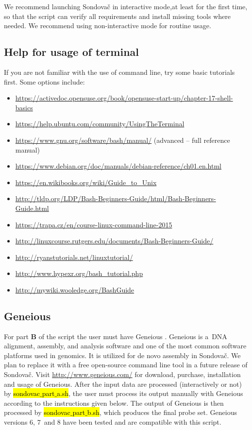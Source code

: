 \documentclass[a4paper, 11pt, twoside]{article}
\renewcommand{\texttt}[1]{\hl{\ttfamily #1}}
\begin{document}
We recommend launching Sondovač in interactive mode,at least for the first time, so that the script can verify all requirements and install missing tools where needed. We recommend using non-interactive mode for routine usage.

\subsection{Help for usage of terminal}

If you are not familiar with the use of command line, try some basic tutorials first. Some options include:

\begin{itemize}
  \item \url{https://activedoc.opensuse.org/book/opensuse-start-up/chapter-17-shell-basics}
  \item \url{https://help.ubuntu.com/community/UsingTheTerminal}
  \item \url{https://www.gnu.org/software/bash/manual/} (advanced -- full reference manual)
  \item \url{https://www.debian.org/doc/manuals/debian-reference/ch01.en.html}
  \item \url{https://en.wikibooks.org/wiki/Guide_to_Unix}
  \item \url{http://tldp.org/LDP/Bash-Beginners-Guide/html/Bash-Beginners-Guide.html}
  \item \url{https://trapa.cz/en/course-linux-command-line-2015}
  \item \url{http://linuxcourse.rutgers.edu/documents/Bash-Beginners-Guide/}
  \item \url{http://ryanstutorials.net/linuxtutorial/}
  \item \url{http://www.hypexr.org/bash_tutorial.php}
  \item \url{http://mywiki.wooledge.org/BashGuide}
\end{itemize}

\subsection{Geneious}
\label{geneious}

For part \textbf{B} of the script the user must have Geneious \citep{Kearse2012}. Geneious is a~DNA alignment, assembly, and analysis software and one of the most common software platforms used in genomics. It is utilized for de novo assembly in Sondovač. We plan to replace it with a free open-source command line tool in a future release of Sondovač. Visit \url{http://www.geneious.com/} for download, purchase, installation and usage of Geneious. After the input data are processed (interactively or not) by \texttt{sondovac$\_$part$\_$a.sh}, the user must process its output manually with Geneious according to the instructions given below. The output of Geneious is then processed by \texttt{sondovac$\_$part$\_$b.sh}, which produces the final probe set. Geneious versions 6, 7~and 8 have been tested and are compatible with this script.
\end{document}
